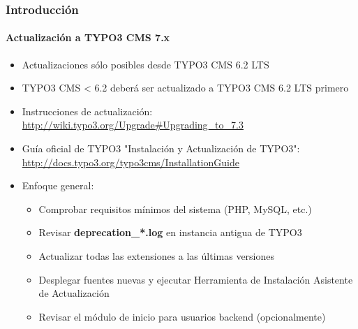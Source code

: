 \begin{frame}[fragile]
	\frametitle{Introducción}
	\framesubtitle{Actualización a TYPO3 CMS 7.x}

	\begin{itemize}
		\item Actualizaciones sólo posibles desde TYPO3 CMS 6.2 LTS
		\item TYPO3 CMS < 6.2 deberá ser actualizado a TYPO3 CMS 6.2 LTS primero
	\end{itemize}

	\begin{itemize}

		\item Instrucciones de actualización:\newline
			\smaller\url{http://wiki.typo3.org/Upgrade#Upgrading_to_7.3}\normalsize
		\item Guía oficial de TYPO3 "Instalación y Actualización de TYPO3":
			\smaller\url{http://docs.typo3.org/typo3cms/InstallationGuide}\normalsize
		\item Enfoque general:
			\begin{itemize}
				\item Comprobar requisitos mínimos del sistema \small(PHP, MySQL, etc.)
				\item Revisar \textbf{deprecation\_*.log} en instancia antigua de TYPO3
				\item Actualizar todas las extensiones a las últimas versiones
				\item Desplegar fuentes nuevas y ejecutar Herramienta de Instalación \textrightarrow Asistente de Actualización
				\item Revisar el módulo de inicio para usuarios backend (opcionalmente)
			\end{itemize}
	\end{itemize}

\end{frame}

